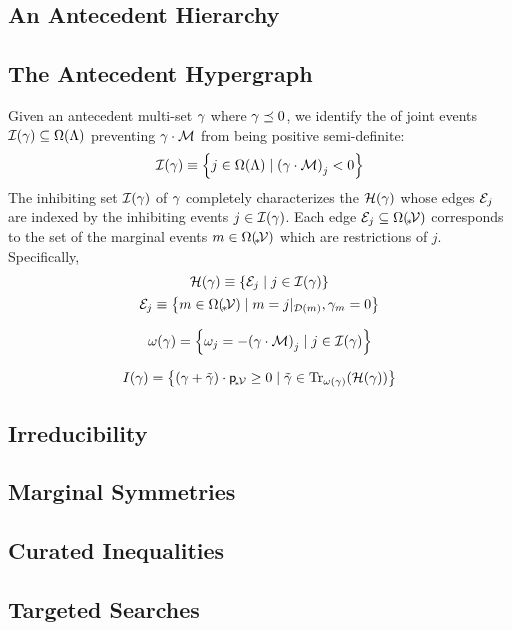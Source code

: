\documentclass[aps, 10pt, english, twoside, twocolumn, pra, nofootinbib, tightenlines, longbibliography, superscriptaddress]{revtex4-1}
\begin{document}
    \subsection{An Antecedent Hierarchy}
    \subsection{The Antecedent Hypergraph}
    Given an antecedent multi-set $\gamma$ where $\gamma \preceq 0$, we identify the  of joint events $\inhibit{\ga} \subseteq \events{\jointvar}$ preventing $\gamma \cdot \mathcal{M}$ from being positive semi-definite:
    \[ \inhibit{\ga} \defined \bc{j \in \events{\jointvar} \mid \br{\ga\cdot\incidence}_{j} < 0} \]
    The inhibiting set $\inhibit{\ga}$ of $\gamma$ completely characterizes the  $\s H\br{\ga}$ whose edges $\mathcal{E}_{j}$ are indexed by the inhibiting events $j \in \inhibit{\ga}$. Each edge $\edges_{j} \subseteq \events{\mscenariowrap}$ corresponds to the set of the marginal events $m \in \events{\mscenariowrap}$ which are restrictions of $j$. Specifically,
    \begin{gather*}
        \s H\br{\ga} \defined \bc{\edges_j \mid j \in \inhibit{\ga}} \\
        \edges_{j} \defined \bc{m \in \events{\mscenariowrap} \mid m = \restrict{j}{\domain{m}}, \ga_{m} = 0}
    \end{gather*}

    \[ \w\br{\ga} = \bc{\w_j = - \br{\ga\cdot\incidence}_{j} \mid j \in \inhibit{\ga}} \]

    \[ I\br{\ga} = \bc{\br{\ga + \ti \ga} \cdot \prob{\mscenariowrap} \geq 0 \mid \ti \ga \in \transversals{\w\br{\ga}}{\s H\br{\ga}}}\]

    \subsection{Irreducibility}
    \subsection{Marginal Symmetries}
    \label{sec:marginal_symmetries}
    \subsection{Curated Inequalities}
    \subsection{Targeted Searches}
\end{document}
